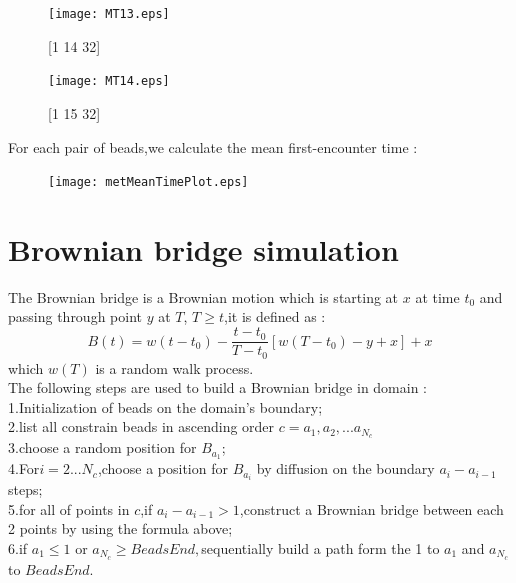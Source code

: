 \documentclass{article}
\begin{document}
							\begin{figure}[H]
								\begin{minipage}[t]{0.5\textwidth}
									\centering
							\texttt{[image: MT13.eps]}
									\caption{[1 14 32]}
								\end{minipage}%
								\begin{minipage}[t]{1.0\textwidth}
									\centering
							\texttt{[image: MT14.eps]}
									\caption{[1 15 32]}
								\end{minipage}
							\end{figure}
For each pair of beads,we calculate the mean first-encounter time :\\
\begin{figure}[H]
\centering
\texttt{[image: metMeanTimePlot.eps]}
\end{figure}
\section{Brownian bridge simulation}
The Brownian bridge is a Brownian motion which is starting at $x$ at time $t_0$ and passing through point $y$ at $T$, $T \geq t$,it is defined as :\\
\begin{equation}
B(t) = w(t-t_0)-\frac{t-t_0}{T-t_0}[w(T-t_0)-y+x]+x
\end{equation}
which $w(T)$ is a random walk process.\\
The following steps are used to build a Brownian bridge in domain :\\

1.Initialization of beads on the domain's boundary;\\

2.list all constrain beads in ascending order $c={a_1,a_2,...a_{N_c}}$\\

3.choose a random position for $B_{a_1}$;\\

4.For$i =2...N_c$,choose a position for $B_{a_i}$ by diffusion on the boundary $a_i -a_{i-1}$ steps;\\

5.for all of points in $c$,if $a_{i}-a_{i-1}>1$,construct a Brownian bridge between each 2 points by using the formula above;\\

6.if $a_1 \leq 1$ or $a_{N_c} \geq BeadsEnd,$sequentially build a path form the 1 to $a_1$ and $a_{N_c}$ to $BeadsEnd$.\\
\end{document}
